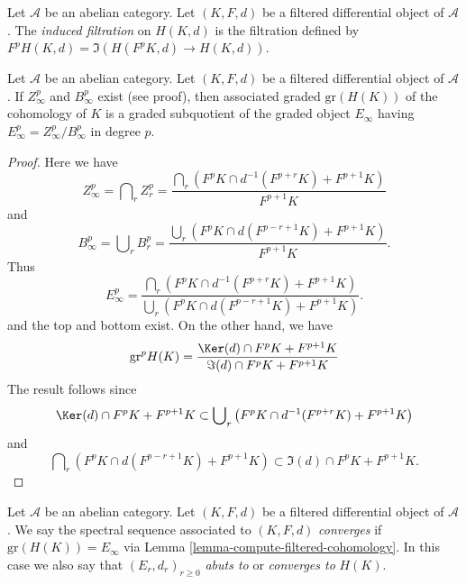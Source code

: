 \begin{definition}
\label{definition-filtration-cohomology-filtered-differential}
Let $\mathcal{A}$ be an abelian category.
Let $(K, F, d)$ be a filtered differential object of $\mathcal{A}$.
The {\it induced filtration} on $H(K, d)$ is the filtration defined
by $F^pH(K, d) = \Im(H(F^pK, d) \to H(K, d))$.
\end{definition}

\begin{lemma}
\label{lemma-compute-filtered-cohomology}
Let $\mathcal{A}$ be an abelian category. Let $(K, F, d)$ be a filtered
differential object of $\mathcal{A}$. If $Z_\infty^p$ and $B_\infty^p$
exist (see proof), then associated graded $\text{gr}(H(K))$ of the
cohomology of $K$ is a graded subquotient of the graded object
$E_\infty$ having $E_\infty^p = Z_\infty^p/B_\infty^p$ in degree $p$.
\end{lemma}

\begin{proof}
Here we have
$$
Z_\infty^p = \bigcap\nolimits_r Z_r^p =
\frac{\bigcap_r (F^pK \cap d^{-1}(F^{p + r}K) + F^{p + 1}K)}{F^{p + 1}K}
$$
and
$$
B_\infty^p = \bigcup\nolimits_r B_r^p =
\frac{\bigcup_r (F^pK \cap d(F^{p - r + 1}K) + F^{p + 1}K)}{F^{p + 1}K}.
$$
Thus
$$
E_\infty^p =
\frac{\bigcap_r (F^pK \cap d^{-1}(F^{p + r}K) + F^{p + 1}K)}
{\bigcup_r (F^pK \cap d(F^{p - r + 1}K) + F^{p + 1}K)}.
$$
and the top and bottom exist. On the other hand, we have
$$
\text{gr}^p H(K) =
\frac{\Ker(d) \cap F^pK + F^{p + 1}K}
{\Im(d) \cap F^pK + F^{p + 1}K}
$$
The result follows since
\begin{equation}
\label{equation-on-top}
\Ker(d) \cap F^pK + F^{p + 1}K
\subset
\bigcup\nolimits_r \left(F^pK \cap d^{-1}(F^{p + r}K) + F^{p + 1}K\right)
\end{equation}
and
\begin{equation}
\label{equation-at-bottom}
\bigcap\nolimits_r \left(F^pK \cap d(F^{p - r + 1}K) + F^{p + 1}K\right)
\subset
\Im(d) \cap F^pK + F^{p + 1}K.
\end{equation}
\end{proof}

\begin{definition}
\label{definition-filtered-differential-ss-converges}
Let $\mathcal{A}$ be an abelian category.
Let $(K, F, d)$ be a filtered differential object of $\mathcal{A}$.
We say the spectral sequence associated to $(K, F, d)$
{\it converges} if $\text{gr}(H(K)) = E_{\infty}$ via
Lemma \ref{lemma-compute-filtered-cohomology}.
In this case we also say that $(E_r, d_r)_{r \geq 0}$ {\it abuts to}
or {\it converges to} $H(K)$.
\end{definition}

